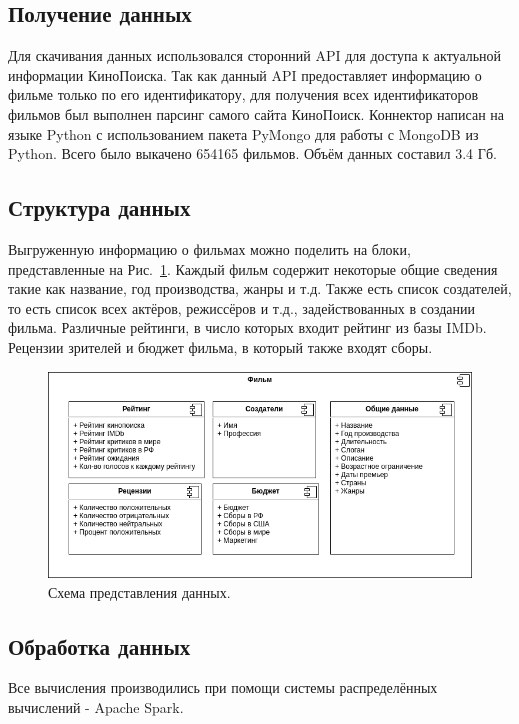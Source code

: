 \documentclass[9pt,conference]{IEEEtran}
\begin{document}
\subsection{Получение данных}

Для скачивания данных использовался сторонний API для доступа к актуальной информации КиноПоиска. Так как данный API предоставляет информацию о фильме только по его идентификатору, для получения всех идентификаторов фильмов был выполнен парсинг самого сайта КиноПоиск. Коннектор написан на языке Python с использованием пакета PyMongo для работы с MongoDB из Python. Всего было выкачено 654165 фильмов. Объём данных составил 3.4 Гб.

\subsection{Структура данных}

Выгруженную информацию о фильмах можно поделить на блоки, представленные на Рис.~\ref{fig:1}. Каждый фильм содержит некоторые общие сведения такие как название, год производства, жанры и т.д. Также есть список создателей, то есть список всех актёров, режиссёров и т.д., задействованных в создании фильма. Различные рейтинги, в число которых входит рейтинг из базы IMDb. Рецензии зрителей и бюджет фильма, в который также входят сборы.

\begin{figure}[ht!]
	\includegraphics[width=\linewidth]{../report/images/dataStructure}
	\caption{Схема представления данных.}
	\label{fig:1}
\end{figure}

\subsection{Обработка данных}

Все вычисления производились при помощи системы распределённых вычислений - Apache Spark.
\end{document}
